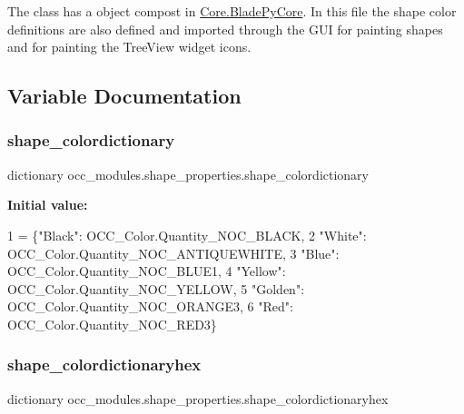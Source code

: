 The class has a object compost in \hyperlink{class_core_1_1_blade_py_core}{Core.\+Blade\+Py\+Core}. In this file the shape color definitions are also defined and imported through the G\+UI for painting shapes and for painting the Tree\+View widget icons. 

\subsection{Variable Documentation}
\hypertarget{namespaceocc__modules_1_1shape__properties_a2435b9798b2353ff84c79fe909cc39fd}{}\label{namespaceocc__modules_1_1shape__properties_a2435b9798b2353ff84c79fe909cc39fd} 
\subsubsection{\texorpdfstring{shape\+\_\+colordictionary}{shape\_colordictionary}}
{\footnotesize\ttfamily dictionary occ\+\_\+modules.\+shape\+\_\+properties.\+shape\+\_\+colordictionary}

{\bfseries Initial value\+:}
\begin{DoxyCode}
1 =  \{\textcolor{stringliteral}{"Black"}: OCC\_Color.Quantity\_NOC\_BLACK,
2                          \textcolor{stringliteral}{"White"}: OCC\_Color.Quantity\_NOC\_ANTIQUEWHITE,
3                          \textcolor{stringliteral}{"Blue"}: OCC\_Color.Quantity\_NOC\_BLUE1,
4                          \textcolor{stringliteral}{"Yellow"}: OCC\_Color.Quantity\_NOC\_YELLOW,
5                          \textcolor{stringliteral}{"Golden"}: OCC\_Color.Quantity\_NOC\_ORANGE3,
6                          \textcolor{stringliteral}{"Red"}: OCC\_Color.Quantity\_NOC\_RED3\}
\end{DoxyCode}
\hypertarget{namespaceocc__modules_1_1shape__properties_a8deb972f03c3f2b89ddc04b0006dd0b2}{}\label{namespaceocc__modules_1_1shape__properties_a8deb972f03c3f2b89ddc04b0006dd0b2} 
\subsubsection{\texorpdfstring{shape\+\_\+colordictionaryhex}{shape\_colordictionaryhex}}
{\footnotesize\ttfamily dictionary occ\+\_\+modules.\+shape\+\_\+properties.\+shape\+\_\+colordictionaryhex}


